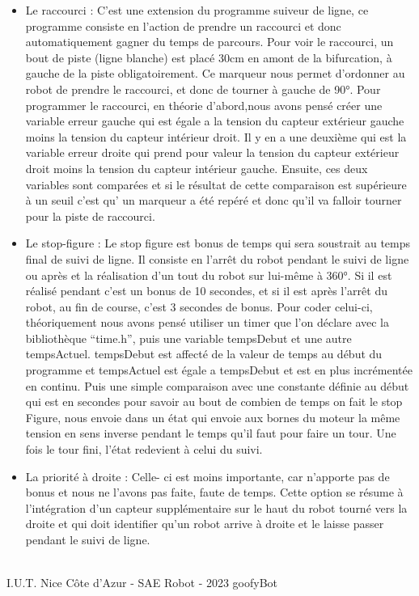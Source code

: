 \begin{itemize}
    \item Le raccourci : C’est une extension du programme suiveur de ligne, ce programme consiste en l’action de prendre un raccourci et donc automatiquement gagner du temps de parcours. Pour voir le raccourci, un bout de piste (ligne blanche) est placé 30cm en amont de la bifurcation, à gauche de la piste obligatoirement. Ce marqueur nous permet d’ordonner au robot de prendre le raccourci, et donc de tourner à gauche de 90°. Pour programmer le raccourci, en théorie d’abord,nous avons pensé créer une variable erreur gauche qui est égale a la tension du capteur extérieur gauche moins la tension du capteur intérieur droit. Il y en a une deuxième qui est la variable erreur droite qui prend pour valeur la tension du capteur extérieur droit moins la tension du capteur intérieur gauche. Ensuite, ces deux variables sont comparées et si le résultat de cette comparaison est supérieure à un seuil c’est qu' un marqueur a été repéré et donc qu'il va falloir tourner pour la piste de raccourci.

    \item Le stop-figure : Le stop figure est bonus de temps qui sera soustrait au temps final de suivi de ligne. Il consiste en l’arrêt du robot pendant le suivi de ligne ou après et la réalisation d’un tout du robot sur lui-même à 360°. Si il est réalisé pendant c’est un bonus de 10 secondes, et si il est après l’arrêt du robot, au fin de course, c’est 3 secondes de bonus. Pour coder celui-ci, théoriquement nous avons pensé utiliser un timer que l’on déclare avec la bibliothèque “time.h”, puis une variable tempsDebut et une autre tempsActuel. tempsDebut est affecté de la valeur de temps au début du programme et tempsActuel est  égale a tempsDebut et est en plus incrémentée en continu. Puis une simple comparaison avec une constante définie au début qui est en secondes pour savoir au bout de combien de temps on fait le stop Figure, nous envoie dans un état qui envoie aux bornes du moteur la même tension en sens inverse pendant le temps qu’il faut pour faire un tour. Une fois le tour fini, l’état redevient à celui du suivi.

    \item La priorité à droite : Celle- ci est moins importante, car n'apporte pas de bonus et nous ne l’avons pas faite, faute de temps. Cette option se résume à l'intégration d’un capteur supplémentaire sur le haut du robot tourné vers la droite et qui doit identifier qu’un robot arrive à droite et le laisse passer pendant le suivi de ligne.
\end{itemize}

\vfill
\noindent\makebox[\linewidth]{\rule{.8\paperwidth}{.6pt}}\\[0.2cm]
I.U.T. Nice Côte d'Azur - SAE Robot - 2023 \hfill goofyBot
\noindent\makebox[\linewidth]{\rule{.8\paperwidth}{.6pt}}
\newpage